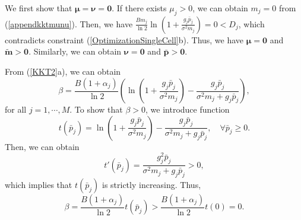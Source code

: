 \documentclass[journal]{IEEEtran}
\begin{document}
We first show that $\pmb \mu=\pmb \nu=\pmb 0$.
If there exists $\mu_j>0$, we can obtain $m_j=0$ from (\ref{appendkktmunu}).
Then, we have ${\frac{B m_j}{\ln2} \ln\left(1+\frac{g_j \bar p_j}{\sigma^2 m_j}\right)}=0<D_j$, which contradicts constraint
(\ref{OptimizationSingleCell}b).
Thus, we have $\pmb \mu=\pmb 0$ and $\pmb {\tilde m } > \pmb 0$.
Similarly, we can obtain $\pmb \nu=\pmb 0$ and $\pmb {\bar p} >\pmb 0$.

From (\ref{KKT2}a), we can obtain
\begin{equation}
\beta= {\frac{B(1+\alpha_j)}{\ln2}}  \left(\ln\left(1+\frac{g_j \bar p_j}{\sigma^2 m_j}\right)
-\frac{g_j \bar p_j}{\sigma^2 m_j+g_j \bar p_j} \right),%
\end{equation}
for all $j=1,\cdots, M$.
To show that $\beta>0$, we introduce function
\begin{equation}
t(\bar p_j)=\ln\left(1+\frac{g_j \bar p_j}{\sigma^2 m_j}\right)
-\frac{g_j \bar p_j}{\sigma^2 m_j+g_j \bar p_j}, \quad \forall \bar p_j\geq 0.
\end{equation}
Then, we can obtain
\begin{equation}
t'(\bar p_j)=\frac{g_j^2\bar p_j}{\sigma^2 m_j+g_j\bar p_j} >0,
\end{equation}
which implies that $t(\bar p_j)$ is strictly increasing.
Thus,
\begin{equation}\label{eqapp_2_15}
\beta= {\frac{B(1+\alpha_j)}{\ln2}}t(\bar p_j)>{\frac{B(1+\alpha_j)}{\ln2}}t(0)=0.
\end{equation}
\end{document}
